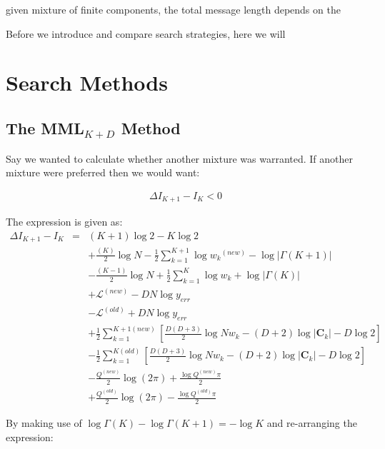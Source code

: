 \documentclass{elsarticle}
\newcommand{\vect}[1]{\boldsymbol{\mathbf{#1}}}
\def\cov{C}
\def\veccov{\vect{\cov}}
\begin{document}
given mixture of finite
components, the total message length depends on the 

Before we introduce and compare search strategies,
here we will 





\section{Search Methods}

\subsection{The MML$_{K+D}$ Method}
Say we wanted to calculate whether another mixture was warranted. If another
mixture were preferred then we would want:

\begin{eqnarray}
  \Delta{}I_{K+1} - I_{K} < 0
\end{eqnarray}

The expression is given as:
\begin{eqnarray*}
\Delta{I_{K+1} - I_K} & = & (K + 1)\log{2} - K\log{2} \\ %
  &&+ \frac{(K)}{2}\log{N} - \frac{1}{2}\sum_{k=1}^{K+1}\log{w_k}^{(new)} - \log{|\Gamma(K+1)|} \\ %
  &&- \frac{(K - 1)}{2}\log{N} + \frac{1}{2}\sum_{k=1}^{K}\log{w_k} + \log{|\Gamma(K)|}\\ %
  &&+ \mathcal{L}^{(new)} - DN\log{y_{err}} \\ %
  &&- \mathcal{L}^{(old)} + DN\log{y_{err}} \\ %
  &&+ \frac{1}{2}\sum_{k=1}^{K+1(new)}\left[\frac{D(D+3)}{2}\log{{Nw_k}} - (D + 2)\log{|\veccov_k|} - D\log{2}\right] \\ %
  &&- \frac{1}{2}\sum_{k=1}^{K(old)}\left[\frac{D(D+3)}{2}\log{{Nw_k}} - (D + 2)\log{|\veccov_k|} - D\log{2}\right] \\ %
  &&- \frac{Q^{(new)}}{2}\log(2\pi) + \frac{\log{Q^{(new)}\pi}}{2} \\ %
  &&+ \frac{Q^{(old)}}{2}\log(2\pi) - \frac{\log{Q^{(old)}\pi}}{2} %
\end{eqnarray*}

\noindent{}By making use of $\log{\Gamma(K)} - \log{\Gamma(K + 1)} = -\log{K}$ and re-arranging the expression:
\end{document}
